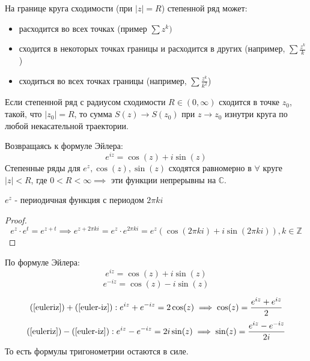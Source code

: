 \begin{note}
    На границе круга сходимости (при $\left| z \right| = R$) степенной ряд может:
    \begin{itemize}
        \item расходится во всех точках (пример $\sum z^k)$
        \item сходится в некоторых точках границы и расходится в других (например, $\sum \frac{z^k}{k}$)
        \item сходиться во всех точках границы (например, $\sum \frac{z^k}{k^2}$)
    \end{itemize}
\end{note}


\begin{theorem}
    Если степенной ряд с радиусом сходимости $R \in (0, \infty)$ сходится в точке $z_0$, такой, что $\left| z_0 \right| = R$, то сумма $S(z) \to S(z_0)$ при $z \to z_0$ изнутри круга по любой некасательной траектории.
\end{theorem}

Возвращаясь к формуле Эйлера:
\[e^{iz} = \cos(z) + i\sin(z)\]
Степенные ряды для $e^z, \cos(z), \sin(z)$ сходятся равномерно в $\forall $ круге $\left| z \right| < R$, где $0 < R < \infty \implies$ эти функции непрерывны на $\mathbb{C}$.

\begin{statement*}
    $e^z$ - периодичная функция с периодом $2\pi ki$
    \begin{proof}
        \[e^z\cdot e^t = e^{z+t} \implies e^{z + 2\pi ki} = e^z\cdot e^{2\pi ki} = e^z(\cos(2\pi ki) + i\sin(2\pi ki)), k \in \mathbb{Z}\]
    \end{proof}
\end{statement*}
По формуле Эйлера:
\begin{equation}
    \label{euleriz}
    e^{iz} = \cos(z) + i\sin(z)
\end{equation}
\begin{equation}
    \label{euler-iz}
    e^{-iz} = \cos(z) - i\sin(z)
\end{equation}

\begin{equation}
    \label{expcos}
    (\ref{euleriz})+(\ref{euler-iz}): e^{iz} + e^{-iz} = 2\cos(z) \implies \cos(z) = \frac{e^{iz} + e^{iz}}{2}
\end{equation}
\begin{equation}
    \label{expsin} 
    (\ref{euleriz})-(\ref{euler-iz}): e^{iz} - e^{-iz} = 2i\sin(z) \implies \sin(z) = \frac{e^{iz} - e^{-iz}}{2i}
\end{equation}
То есть формулы тригонометрии остаются в силе.

